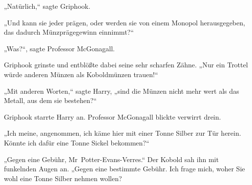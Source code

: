 „Natürlich,“ sagte Griphook.

„Und kann sie jeder prägen, oder werden sie von einem Monopol herausgegeben, das dadurch Münzprägegewinn einnimmt?“

„Was?“, sagte Professor McGonagall.

Griphook grinste und entblößte dabei seine sehr scharfen Zähne. „Nur ein Trottel würde anderen Münzen als Koboldmünzen trauen!“

„Mit anderen Worten,“ sagte Harry, „sind die Münzen nicht mehr wert als das Metall, aus dem sie bestehen?“

Griphook starrte Harry an. Professor McGonagall blickte verwirrt drein.

„Ich meine, angenommen, ich käme hier mit einer Tonne Silber zur Tür herein. Könnte ich dafür eine Tonne Sickel bekommen?“

„Gegen eine Gebühr, Mr~Potter-Evans-Verres.“ Der Kobold sah ihn mit funkelnden Augen an. „Gegen eine bestimmte Gebühr. Ich frage mich, woher Sie wohl eine Tonne Silber nehmen wollen?

